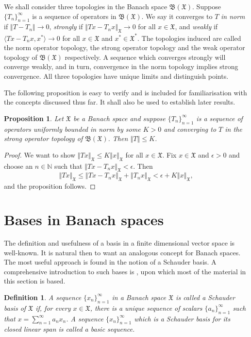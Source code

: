 \documentclass[honours,12pt]{unswthesis}
\newcommand{\N}{\mathbb{N}}
\newcommand{\B}{\mathfrak{B}}
\newcommand{\X}{\mathfrak{X}}
\def\ip<#1,#2>{\langle #1,#2 \rangle}
\def\norm#1{\left \Vert #1 \right \Vert}
\newtheorem{proposition}[theorem]{Proposition}
\newtheorem{definition}[theorem]{Definition}
\numberwithin{equation}{section}
\begin{document}
We shall consider three topologies in the Banach space $\B(\X)$.
Suppose $\{T_n\}_{n=1}^{\infty}$ is a sequence of operators in $\B(\X)$.
We say it
converges to $T$ {\em in norm} if $\norm{T-T_n}\rightarrow 0$, {\em strongly} if
$\norm{Tx-T_nx}_{\X}\rightarrow 0$ for all $x\in\X$, and {\em weakly} if
$\ip<Tx-T_nx,x^*>\rightarrow 0$ for all $x\in\X$ and $x^*\in\X^*$. The 
topologies
induced are called the norm operator topology, the strong operator topology and
the weak
operator topology of $\B(\X)$ respectively. A sequence which converges strongly
will converge weakly, and in turn, convergence in the norm topology implies
strong convergence. All three topologies have unique limits and distinguish
points.

The following proposition is easy to verify and is included for familiarisation
with the concepts discussed thus far. It shall also be used to establish later
results.

\begin{proposition}\label{SOT convergence}
Let $\X$ be a Banach space and suppose $\{T_n\}_{n=1}^{\infty}$ is a sequence of
operators uniformly bounded in norm by some $K>0$ and converging to $T$
in the strong operator topology of $\B(\X)$. Then $\norm{T}\leq
K$.
\end{proposition}

\begin{proof}
We want to show $\norm{Tx}_{\X}\leq K\norm{x}_{\X}$ for all $x\in\X$. Fix
$x\in\X$ and $\epsilon>0$ and choose an $n\in\N$ such that
$\norm{Tx-T_nx}_{\X}<\epsilon$. Then 
\[\norm{Tx}_{\X}\leq\norm{Tx-T_nx}_{\X}+\norm{T_nx}_{\X}
<\epsilon+K\norm{x}_{\X},\]
and the proposition follows.
\end{proof}



\section{Bases in Banach spaces}\label{bases}


The definition and usefulness of a basis in a finite dimensional vector space is
well-known. It is natural then to want an analogous concept for
Banach spaces. The most useful approach is found in the notion of a Schauder
basis. A comprehensive introduction to such bases is \cite[pp. 1--52]{Lind},
upon which most of the material in this section is based. 

\begin{definition}
A sequence $\{x_n\}_{n=1}^{\infty}$ in a Banach space $\X$ is called a {\em 
Schauder basis of $\X$} if, for every $x\in\X$, there is a unique sequence of
scalars $\{a_n\}_{n=1}^{\infty}$ such that $x=\sum_{n=1}^{\infty}a_nx_n$. A
sequence $\{x_n\}_{n=1}^{\infty}$ which is a Schauder basis for its closed
linear span is called a {\em basic sequence}.
\end{definition}
\end{document}

